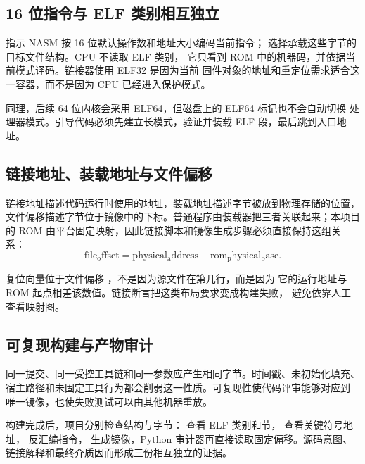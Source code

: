 \subsection{16 位指令与 ELF 类别相互独立}

 指示 NASM 按 16 位默认操作数和地址大小编码当前指令；
 选择承载这些字节的目标文件结构。CPU 不读取 ELF 类别，
它只看到 ROM 中的机器码，并依据当前模式译码。链接器使用 ELF32 是因为当前
固件对象的地址和重定位需求适合这一容器，而不是因为 CPU 已经进入保护模式。

同理，后续 64 位内核会采用 ELF64，但磁盘上的 ELF64 标记也不会自动切换
处理器模式。引导代码必须先建立长模式，验证并装载 ELF 段，最后跳到入口地址。

\subsection{链接地址、装载地址与文件偏移}

链接地址描述代码运行时使用的地址，装载地址描述字节被放到物理存储的位置，
文件偏移描述字节位于镜像中的下标。普通程序由装载器把三者关联起来；本项目
的 ROM 由平台固定映射，因此链接脚本和镜像生成步骤必须直接保持这组关系：
\[
  \mathrm{file_offset} =
  \mathrm{physical_address} - \mathrm{rom_physical_base}.
\]

复位向量位于文件偏移 ，不是因为源文件在第几行，而是因为
它的运行地址与 ROM 起点相差该数值。链接断言把这类布局要求变成构建失败，
避免依靠人工查看映射图。

\subsection{可复现构建与产物审计}

同一提交、同一受控工具链和同一参数应产生相同字节。时间戳、未初始化填充、
宿主路径和未固定工具行为都会削弱这一性质。可复现性使代码评审能够对应到
唯一镜像，也使失败测试可以由其他机器重放。

构建完成后，项目分别检查结构与字节： 查看 ELF 类别和节，
 查看关键符号地址， 反汇编指令，
 生成镜像，Python 审计器再直接读取固定偏移。源码意图、
链接解释和最终介质因而形成三份相互独立的证据。
